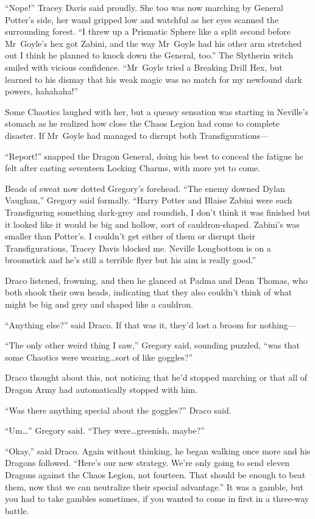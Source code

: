 “Nope!” Tracey Davis said proudly. She too was now marching by General Potter’s side, her wand gripped low and watchful as her eyes scanned the surrounding forest. “I threw up a Prismatic Sphere like a split second before Mr~Goyle’s hex got Zabini, and the way Mr~Goyle had his other arm stretched out I think he planned to knock down the General, too.” The Slytherin witch smiled with vicious confidence. “Mr~Goyle tried a Breaking Drill Hex, but learned to his dismay that his weak magic was no match for my newfound dark powers, hahahaha!”

Some Chaotics laughed with her, but a queasy sensation was starting in Neville’s stomach as he realized how close the Chaos Legion had come to complete disaster. If Mr~Goyle had managed to disrupt both Transfigurations—

\later

“Report!” snapped the Dragon General, doing his best to conceal the fatigue he felt after casting seventeen Locking Charms, with more yet to come.

Beads of sweat now dotted Gregory’s forehead. “The enemy downed Dylan Vaughan,” Gregory said formally. “Harry Potter and Blaise Zabini were each Transfiguring something dark-grey and roundish, I don’t think it was finished but it looked like it would be big and hollow, sort of cauldron-shaped. Zabini’s was smaller than Potter’s. I couldn’t get either of them or disrupt their Transfigurations, Tracey Davis blocked me. Neville Longbottom is on a broomstick and he’s still a terrible flyer but his aim is really good.”

Draco listened, frowning, and then he glanced at Padma and Dean Thomas, who both shook their own heads, indicating that they also couldn’t think of what might be big and grey and shaped like a cauldron.

“Anything else?” said Draco. If that was it, they’d lost a broom for nothing—

“The only other weird thing I saw,” Gregory said, sounding puzzled, “was that some Chaotics were wearing…sort of like goggles?”

Draco thought about this, not noticing that he’d stopped marching or that all of Dragon Army had automatically stopped with him.

“Was there anything special about the goggles?” Draco said.

“Um…” Gregory said. “They were…greenish, maybe?”

“Okay,” said Draco. Again without thinking, he began walking once more and his Dragons followed. “Here’s our new strategy. We’re only going to send eleven Dragons against the Chaos Legion, not fourteen. That should be enough to beat them, now that we can neutralize their special advantage.” It was a gamble, but you had to take gambles sometimes, if you wanted to come in first in a three-way battle.

